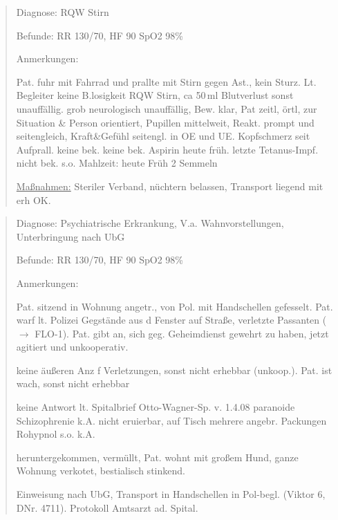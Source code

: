 \begin{quote}
{\sffamily Diagnose:} {\ttfamily\color{darkBlue} RQW Stirn}

{\sffamily Befunde:} {\sffamily RR}
{\ttfamily\color{darkBlue} 130/70,} {\sffamily HF}
{\ttfamily\color{darkBlue} 90} {\sffamily SpO2}
{\ttfamily\color{darkBlue} 98\% }

{\sffamily Anmerkungen:} {\ttfamily\color{darkBlue} Pat.
fuhr mit Fahrrad und prallte mit Stirn gegen Ast., kein Sturz. Lt. Begleiter
keine B.losigkeit  RQW Stirn,
ca 50\,ml Blutverlust sonst unauffällig. 
grob neurologisch unauffällig, Bew. klar, Pat zeitl, örtl, zur Situation \& Person orientiert, Pupillen
mittelweit, Reakt. prompt und seitengleich, Kraft\&Gefühl
seitengl. in OE und UE.   Kopfschmerz seit
Aufprall.  keine bek. 
keine bek.  Aspirin heute früh. letzte
Tetanus-Impf. nicht bek.  s.o.
 Mahlzeit: heute Früh 2 Semmeln 

\underline{Maßnahmen:} Steriler Verband, nüchtern belassen,
Transport liegend mit erh OK.}
\end{quote}


\begin{quote}
{\sffamily Diagnose:} {\ttfamily\color{darkBlue}
Psychiatrische Erkrankung, V.a. Wahnvorstellungen, Unterbringung nach UbG}

{\sffamily Befunde:} {\sffamily RR}
{\ttfamily\color{darkBlue} 130/70,} {\sffamily HF}
{\ttfamily\color{darkBlue} 90} {\sffamily SpO2}
{\ttfamily\color{darkBlue} 98\% }

{\sffamily Anmerkungen:} {\ttfamily\color{darkBlue} Pat.
sitzend in Wohnung angetr., von Pol. mit Handschellen gefesselt. Pat. warf lt. Polizei Gegstände aus d Fenster
auf Straße, verletzte Passanten ($\rightarrow$ FLO-1). Pat.
gibt an, sich geg. Geheimdienst gewehrt zu haben,
jetzt agitiert und unkooperativ. 

 keine äußeren Anz f Verletzungen,
sonst nicht erhebbar (unkoop.).  Pat.
ist wach, sonst nicht erhebbar

  keine Antwort
 lt. Spitalbrief Otto-Wagner-Sp. v.
1.4.08 paranoide Schizophrenie  k.A.
 nicht eruierbar, auf Tisch mehrere
angebr. Packungen Rohypnol  s.o.
 k.A.

 heruntergekommen, vermüllt, Pat.
wohnt mit großem Hund, ganze Wohnung verkotet, bestialisch
stinkend. 

 Einweisung nach UbG, Transport in
Handschellen in Pol-begl. (Viktor 6, DNr. 4711). Protokoll
Amtsarzt ad. Spital.}
\end{quote}


